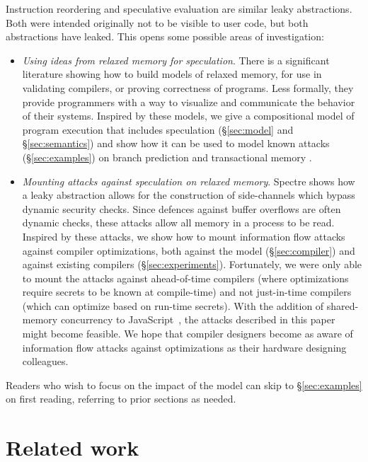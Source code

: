 Instruction reordering and speculative evaluation are similar leaky abstractions.
Both were intended originally not to
be visible to user code, but both abstractions have leaked.
This opens some possible areas of investigation:
\begin{itemize}

\item \emph{Using ideas from relaxed memory for speculation}.  There is a
  significant literature showing how to build models of relaxed memory, for
  use in validating compilers, or proving correctness of programs.  Less
  formally, they provide programmers with a way to visualize and communicate
  the behavior of their systems.  Inspired by these models, we give a
  compositional model of program execution that includes speculation
  (\S\ref{sec:model} and \S\ref{sec:semantics}) and show how it can be used
  to model known attacks (\S\ref{sec:examples}) on branch prediction
  \cite{DBLP:journals/corr/abs-1801-01203} and transactional memory
  \cite{ChongSW18,DBLP:conf/uss/DisselkoenKPT17}.

\item \emph{Mounting attacks against speculation on relaxed memory}.
  Spectre shows how a leaky abstraction allows for the construction of
  side-channels which bypass dynamic security checks. Since defences
  against buffer overflows are often dynamic checks, these attacks
  allow all memory in a process to be read.  Inspired by these
  attacks, we show how to mount information flow attacks against
  compiler optimizations, both against the model (\S\ref{sec:compiler})
  and against existing compilers (\S\ref{sec:experiments}).
  Fortunately, we were only able to mount the attacks against
  ahead-of-time compilers (where optimizations require secrets
  to be known at compile-time) and not just-in-time compilers
  (which can optimize based on run-time secrets).
  With the addition of shared-memory concurrency
  to JavaScript~\cite[\S24.2]{ecma-262}, the attacks described in this paper might
  become feasible. We hope that compiler designers become as
  aware of information flow attacks against optimizations as their
  hardware designing colleagues.

\end{itemize}
Readers who wish to focus on the impact of the model can skip to \S\ref{sec:examples}
on first reading, referring to prior sections as needed.

\section{Related work}

